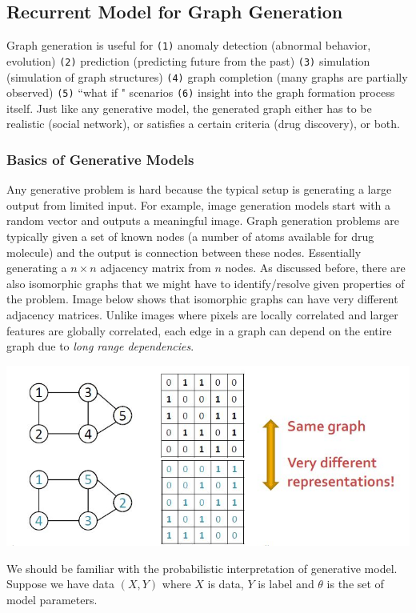 \subsection{Recurrent Model for Graph Generation}

Graph generation is useful for \texttt{(1)} anomaly detection (abnormal behavior, evolution) \texttt{(2)} prediction (predicting future from the past) \texttt{(3)} simulation (simulation of graph structures) \texttt{(4)} graph completion (many graphs are partially observed) \texttt{(5)} ``what if " scenarios \texttt{(6)} insight into the graph formation process itself. Just like any generative model, the generated graph either has to be realistic 
(social network), or satisfies a certain criteria (drug discovery), or both.

\subsubsection{Basics of Generative Models} \label{ss_621_basics}

Any generative problem is hard because the typical setup is generating a large output from limited input. For example, image generation models start with a random vector and outputs a meaningful image. Graph generation problems are typically given a set of known nodes (a number of atoms available for drug molecule) and the output is connection between these nodes. Essentially generating a $n \times n$ adjacency matrix from $n$ nodes. As discussed before, there are also isomorphic graphs that we might have to identify/resolve given properties of the problem. Image below shows that isomorphic graphs can have very different adjacency matrices. Unlike images where pixels are locally correlated and larger features are globally correlated, each edge in a graph can depend on the entire graph due to \textit{long range dependencies}. 

{
\centering
\includegraphics[width=0.7\linewidth]{notes/img/l10_p19_isomorphism.JPG} \par
}

We should be familiar with the probabilistic interpretation of generative model. Suppose we have data $(X, Y)$ where $X$ is data, $Y$ is label and $\theta$ is the set of model parameters.

